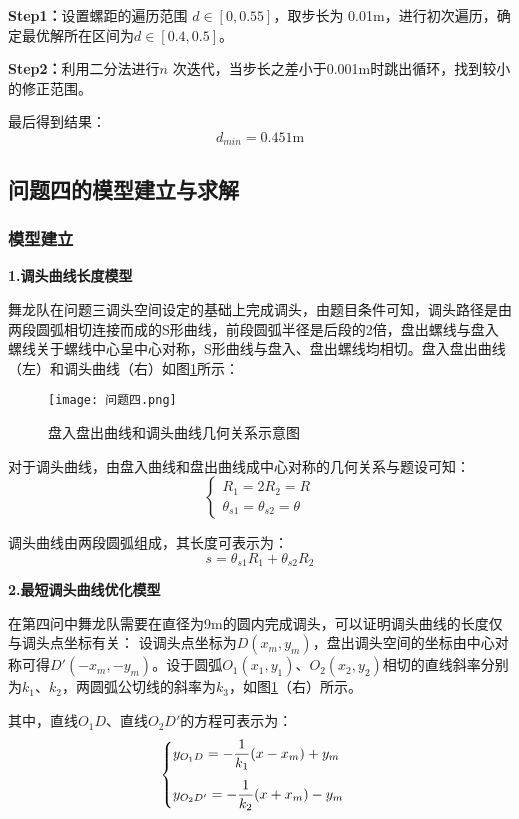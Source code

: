 \documentclass[withoutpreface,bwprint]{cumcmthesis} %
\begin{document}
	\textbf{Step1：}设置螺距的遍历范围 $d\in [0, 0.55]$，取步长为 0.01m，进行初次遍历，确定最优解所在区间为$d\in [0.4, 0.5]$。 
	
	\textbf{Step2：}利用二分法进行$n$ 次迭代，当步长之差小于0.001m时跳出循环，找到较小的修正范围。
	
	最后得到结果：
	\begin{equation}
		d_{min}=0.451\mbox{m}
	\end{equation}

	\subsection{问题四的模型建立与求解}
	\subsubsection{模型建立}
	\textbf{1.调头曲线长度模型}
	
	舞龙队在问题三调头空间设定的基础上完成调头，由题目条件可知，调头路径是由两段圆弧相切连接而成的S形曲线，前段圆弧半径是后段的2倍，盘出螺线与盘入螺线关于螺线中心呈中心对称，S形曲线与盘入、盘出螺线均相切。盘入盘出曲线（左）和调头曲线（右）如图\ref{问题四}所示：
	\begin{figure}[H]
		\centering
		\texttt{[image: 问题四.png]}
		\caption{盘入盘出曲线和调头曲线几何关系示意图}
		\label{问题四}
	\end{figure}
	对于调头曲线，由盘入曲线和盘出曲线成中心对称的几何关系与题设可知：
	\begin{equation}
		\begin{cases}
			R_1=2R_2=R\\
			\theta_{s1}=\theta_{s2}=\theta
		\end{cases}
	\end{equation}
	
	调头曲线由两段圆弧组成，其长度可表示为：
	\begin{equation}
		s=\theta_{s1}R_1+\theta_{s2}R_2
	\end{equation}
	
	\textbf{2.最短调头曲线优化模型}
	
	在第四问中舞龙队需要在直径为9m的圆内完成调头，可以证明调头曲线的长度仅与调头点坐标有关：
	设调头点坐标为$D(x_m,y_m)$，盘出调头空间的坐标由中心对称可得$D'(-x_m,-y_m)$。设于圆弧$O_1(x_1,y_1)$、$O_2(x_2,y_2)$相切的直线斜率分别为$k_1$、$k_2$，两圆弧公切线的斜率为$k_3$，如图\ref{问题四}（右）所示。
	
	其中，直线$O_1D$、直线$O_2D'$的方程可表示为：
	\begin{equation}
		\begin{cases}
			\vspace{\topsep}
			y_{O_1 D}=-\dfrac{1}{k_1}(x-x_m)+y_m \\
			y_{O_2 D'}=-\dfrac{1}{k_2}(x+x_m)-y_m
		\end{cases}
	\end{equation}
	
\end{document}
